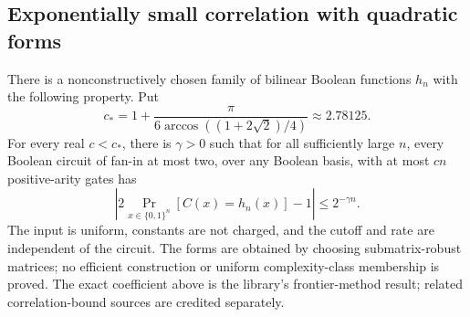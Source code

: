 \begin{result}
\subsection{Exponentially small correlation with quadratic forms}
There is a nonconstructively chosen family of bilinear Boolean functions $h_n$
with the following property. Put
\[
c_* = 1+\frac{\pi}{6\arccos((1+2\sqrt2)/4)}\approx2.78125.
\]
For every real $c<c_*$, there is $\gamma>0$ such that for all sufficiently
large $n$, every Boolean circuit of fan-in at most two, over any Boolean basis,
with at most $cn$ positive-arity gates has
\[
\left|2\Pr_{x\in\{0,1\}^n}[C(x)=h_n(x)]-1\right|\le2^{-\gamma n}.
\]
The input is uniform, constants are not charged, and the cutoff and rate are
independent of the circuit. The forms are obtained by choosing submatrix-robust
matrices; no efficient construction or uniform complexity-class membership is
proved. The exact coefficient above is the library's frontier-method result;
related correlation-bound sources are credited separately.\citep{ChenKabanets2015,GKST2016,Jukna2011}
\end{result}

